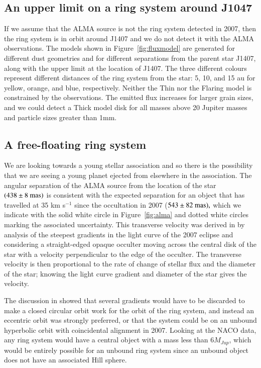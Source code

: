 \documentclass{aa} %
\newcommand{\kms}{km s$^{-1}$}
\begin{document}
\subsection{An upper limit on a ring system around J1047} %

If we assume that the ALMA source is not the ring system detected in 2007, then the ring system is in orbit around J1407 and we do not detect it with the ALMA observations.
%
The models shown in Figure~\ref{fig:fluxmodel} are generated  for different dust geometries and for different separations from the parent star J1407, along with the upper limit at the location of J1407.
%
The three different colours represent different distances of the ring system from the star:   5, 10, and 15 au for yellow, orange, and blue, respectively.
%
Neither the Thin nor the Flaring model is constrained by the observations.
%
The emitted flux increases for larger grain sizes, and we could detect a Thick model disk for all masses above 20 Jupiter masses and particle sizes greater than 1mm.

\subsection{A free-floating ring system} %

We  are looking towards a young stellar association and so there is the possibility that we are seeing a young planet ejected from elsewhere in the association.
%
The angular separation of the ALMA source from the location of the star $(438\pm8\rm{~mas})$ is consistent with the expected separation for an object that has travelled at 35 \kms{} since the occultation in 2007  ($543\pm82\rm{~mas),}$ which we indicate with the solid white circle in Figure~\ref{fig:alma} and dotted white circles marking the associated uncertainty.
%
This transverse velocity was derived in \citet{Kenworthy15} by analysis of the steepest gradients in the light curve of the 2007 eclipse and considering a straight-edged opaque occulter moving across the central disk of the star with a velocity perpendicular to the edge of the occulter.
%
The transverse velocity is then proportional to the rate of change of stellar flux and the diameter of the star;  knowing the light curve gradient and diameter of the star gives the velocity.

The discussion in \citet{Kenworthy15} showed that several gradients would have to be discarded to make a closed circular orbit work for the orbit of the ring system, and instead an eccentric orbit was strongly preferred,  or that the system could be on an unbound hyperbolic orbit with coincidental alignment in 2007.
%
Looking at the NACO data, any ring system would have a central object with a mass less than $6M_{Jup}$, which would be entirely possible for an unbound ring system since an unbound object does not have an associated Hill sphere.
\end{document}
